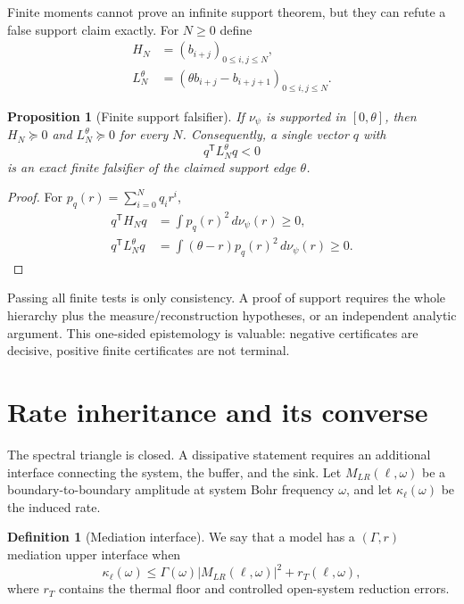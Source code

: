 \documentclass[11pt,a4paper]{article}
\newtheorem{proposition}[theorem]{Proposition}
\theoremstyle{definition}
\newtheorem{definition}[theorem]{Definition}
\theoremstyle{remark}
\begin{document}
Finite moments cannot prove an infinite support theorem, but they can refute a
false support claim exactly.  For $N\geq0$ define
\begin{align}
  H_N&=(b_{i+j})_{0\leq i,j\leq N},\\
  L_N^\theta&=(\theta b_{i+j}-b_{i+j+1})_{0\leq i,j\leq N}.
  \label{eq:moment-matrices}
\end{align}

\begin{proposition}[Finite support falsifier]
\label{prop:finite-falsifier}
If $\nu_\psi$ is supported in $[0,\theta]$, then
$H_N\succeq0$ and $L_N^\theta\succeq0$ for every $N$.  Consequently, a
single vector $q$ with
\[
  q^{\mathsf T}L_N^\theta q<0
\]
is an exact finite falsifier of the claimed support edge $\theta$.
\end{proposition}

\begin{proof}
For $p_q(r)=\sum_{i=0}^Nq_ir^i$,
\begin{align}
  q^{\mathsf T}H_Nq
  &=\int p_q(r)^2\,d\nu_\psi(r)\geq0,\\
  q^{\mathsf T}L_N^\theta q
  &=\int(\theta-r)p_q(r)^2\,d\nu_\psi(r)\geq0.
\end{align}
\end{proof}

Passing all finite tests is only consistency.  A proof of support requires the
whole hierarchy plus the measure/reconstruction hypotheses, or an independent
analytic argument.  This one-sided epistemology is valuable: negative
certificates are decisive, positive finite certificates are not terminal.

\section{Rate inheritance and its converse}
\label{sec:rate}

The spectral triangle is closed.  A dissipative statement requires an
additional interface connecting the system, the buffer, and the sink.  Let
$M_{LR}(\ell,\omega)$ be a boundary-to-boundary amplitude at system Bohr
frequency $\omega$, and let $\kappa_\ell(\omega)$ be the induced rate.

\begin{definition}[Mediation interface]
We say that a model has a $(\Gamma,r)$ mediation upper interface when
\[
  \kappa_\ell(\omega)
  \leq\Gamma(\omega)|M_{LR}(\ell,\omega)|^2
  +r_T(\ell,\omega),
  \label{eq:mediation-interface}
\]
where $r_T$ contains the thermal floor and controlled open-system reduction
errors.
\end{definition}
\end{document}
